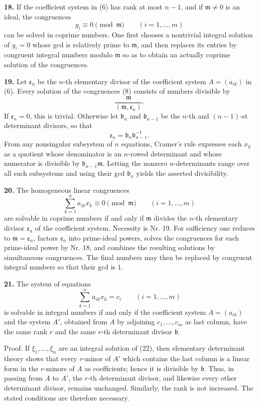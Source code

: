 \documentclass[11pt,a4paper]{article}
\begin{document}
\textbf{18.} If the coefficient system in (6) has rank at most \(n-1\), and if \(\mathfrak m\ne0\) is an ideal, the congruences
\[
 y_i\equiv0\pmod{\mathfrak m}\qquad(i=1,\ldots,m) \tag{8}
\]
can be solved in coprime numbers. One first chooses a nontrivial integral solution of \(y_i=0\) whose gcd is relatively prime to \(\mathfrak m\), and then replaces its entries by congruent integral numbers modulo \(\mathfrak m\) so as to obtain an actually coprime solution of the congruences.

\textbf{19.} Let \(\mathfrak e_n\) be the \(n\)-th elementary divisor of the coefficient system \(A=(a_{ik})\) in (6). Every solution of the congruences (8) consists of numbers divisible by
\[
 \frac{\mathfrak m}{(\mathfrak m,\mathfrak e_n)}.
\]
If \(\mathfrak e_n=0\), this is trivial. Otherwise let \(\mathfrak b_n\) and \(\mathfrak b_{n-1}\) be the \(n\)-th and \((n-1)\)-st determinant divisors, so that
\[
 \mathfrak e_n=\mathfrak b_n\mathfrak b_{n-1}^{-1}.
\]
From any nonsingular subsystem of \(n\) equations, Cramer's rule expresses each \(x_k\) as a quotient whose denominator is an \(n\)-rowed determinant and whose numerator is divisible by \(\mathfrak b_{n-1}\mathfrak m\). Letting the nonzero \(n\)-determinants range over all such subsystems and using their gcd \(\mathfrak b_n\) yields the asserted divisibility.

\textbf{20.} The homogeneous linear congruences
\[
 \sum_{k=1}^{n}a_{ik}x_k\equiv0\pmod{\mathfrak m}\qquad(i=1,\ldots,m) \tag{9}
\]
are solvable in coprime numbers if and only if \(\mathfrak m\) divides the \(n\)-th elementary divisor \(\mathfrak e_n\) of the coefficient system. Necessity is Nr. 19. For sufficiency one reduces to \(\mathfrak m=\mathfrak e_n\), factors \(\mathfrak e_n\) into prime-ideal powers, solves the congruences for each prime-ideal power by Nr. 18, and combines the resulting solutions by simultaneous congruences. The final numbers may then be replaced by congruent integral numbers so that their gcd is \(1\).


\textbf{21.} The system of equations
\[
 \sum_{k=1}^{n} a_{ik}x_k=c_i\qquad(i=1,\ldots,m) \tag{22}
\]
is solvable in integral numbers if and only if the coefficient system \(A=(a_{ik})\) and the system \(A'\), obtained from \(A\) by adjoining \(c_1,\ldots,c_m\) as last column, have the same rank \(r\) and the same \(r\)-th determinant divisor \(\mathfrak b\).

Proof. If \(\xi_1,\ldots,\xi_n\) are an integral solution of (22), then elementary determinant theory shows that every \(r\)-minor of \(A'\) which contains the last column is a linear form in the \(r\)-minors of \(A\) as coefficients; hence it is divisible by \(\mathfrak b\). Thus, in passing from \(A\) to \(A'\), the \(r\)-th determinant divisor, and likewise every other determinant divisor, remains unchanged. Similarly, the rank is not increased. The stated conditions are therefore necessary.
\end{document}

